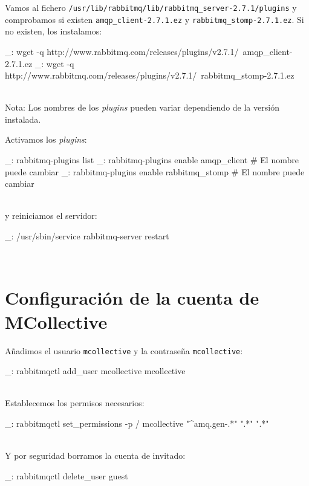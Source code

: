 Vamos al fichero \texttt{/usr/lib/rabbitmq/lib/rabbitmq\_server-2.7.1/plugins} 
y comprobamos si existen \texttt{amqp\_client-2.7.1.ez} y \texttt{rabbitmq\_stomp-2.7.1.ez}. Si no existen, los instalamos:

\begin{bashcode}
_: wget -q http://www.rabbitmq.com/releases/plugins/v2.7.1/\
amqp_client-2.7.1.ez
_: wget -q http://www.rabbitmq.com/releases/plugins/v2.7.1/\
rabbitmq_stomp-2.7.1.ez
\end{bashcode}
\\

Nota: Los nombres de los \emph{plugins} pueden variar dependiendo de la versión instalada.

Activamos los \emph{plugins}:

\begin{bashcode}
_: rabbitmq-plugins list
_: rabbitmq-plugins enable amqp_client           # El nombre puede cambiar
_: rabbitmq-plugins enable rabbitmq_stomp        # El nombre puede cambiar
\end{bashcode}
\\

y reiniciamos el servidor:

\begin{bashcode}
_: /usr/sbin/service rabbitmq-server restart
\end{bashcode}
\\


\section{Configuración de la cuenta de MCollective}

Añadimos el usuario \texttt{mcollective} y la contraseña \texttt{mcollective}:
\begin{bashcode}
_: rabbitmqctl add_user mcollective mcollective
\end{bashcode}
\\

Establecemos los permisos necesarios:

\begin{bashcode}
_: rabbitmqctl set_permissions -p / mcollective "^amq.gen-.*" ".*" ".*"
\end{bashcode}
\\

Y por seguridad borramos la cuenta de invitado:

\begin{bashcode}
_: rabbitmqctl delete_user guest
\end{bashcode}
\\


